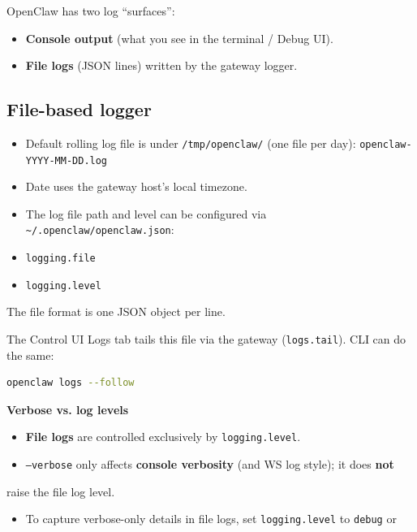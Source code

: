 OpenClaw has two log “surfaces”:

\begin{itemize}
  \item \textbf{Console output} (what you see in the terminal / Debug UI).
  \item \textbf{File logs} (JSON lines) written by the gateway logger.
\end{itemize}


\subsection{File-based logger}


\begin{itemize}
  \item Default rolling log file is under \texttt{/tmp/openclaw/} (one file per day): \texttt{openclaw-YYYY-MM-DD.log}
  \item Date uses the gateway host's local timezone.
  \item The log file path and level can be configured via \texttt{\textasciitilde{}/.openclaw/openclaw.json}:
  \item \texttt{logging.file}
  \item \texttt{logging.level}
\end{itemize}


The file format is one JSON object per line.

The Control UI Logs tab tails this file via the gateway (\texttt{logs.tail}).
CLI can do the same:

\begin{lstlisting}[language=bash]
openclaw logs --follow
\end{lstlisting}


\textbf{Verbose vs. log levels}

\begin{itemize}
  \item \textbf{File logs} are controlled exclusively by \texttt{logging.level}.
  \item \texttt{--verbose} only affects \textbf{console verbosity} (and WS log style); it does \textbf{not}
\end{itemize}

raise the file log level.
\begin{itemize}
  \item To capture verbose-only details in file logs, set \texttt{logging.level} to \texttt{debug} or
\end{itemize}

